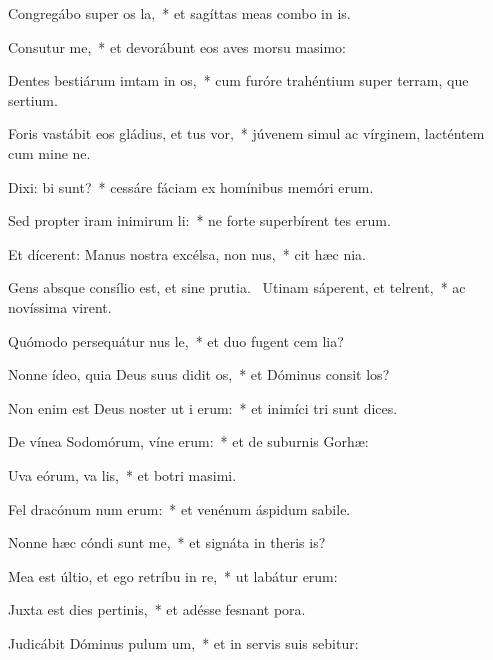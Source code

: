 \item Congregábo super os la,~* et sagíttas meas combo in is.
\item Consutur me,~* et devorábunt eos aves morsu masimo:
\item Dentes bestiárum imtam in os,~* cum furóre trahéntium super terram, que sertium.
\item Foris vastábit eos gládius, et tus vor,~* júvenem simul ac vírginem, lacténtem cum mine ne.
\item Dixi: bi sunt?~* cessáre fáciam ex homínibus memóri erum.
\item Sed propter iram inimirum li:~* ne forte superbírent tes erum.
\item Et dícerent: Manus nostra excélsa,  non nus,~* cit hæc nia.
\item Gens absque consílio est, et sine prutia.~\pscross{} Utinam sáperent, et telrent,~* ac novíssima virent.
\item Quómodo persequátur nus le,~* et duo fugent cem lia?
\item Nonne ídeo, quia Deus suus didit os,~* et Dóminus consit los?
\item Non enim est Deus noster ut i erum:~* et inimíci tri sunt dices.
\item De vínea Sodomórum, víne erum:~* et de suburnis Gorhæ:
\item Uva eórum, va lis,~* et botri masimi.
\item Fel dracónum num erum:~* et venénum áspidum sabile.
\item Nonne hæc cóndi sunt  me,~* et signáta in theris is?
\item Mea est últio, et ego retríbu in re,~* ut labátur  erum:
\item Juxta est dies pertinis,~* et adésse fesnant pora.
\item Judicábit Dóminus pulum um,~* et in servis suis sebitur:
